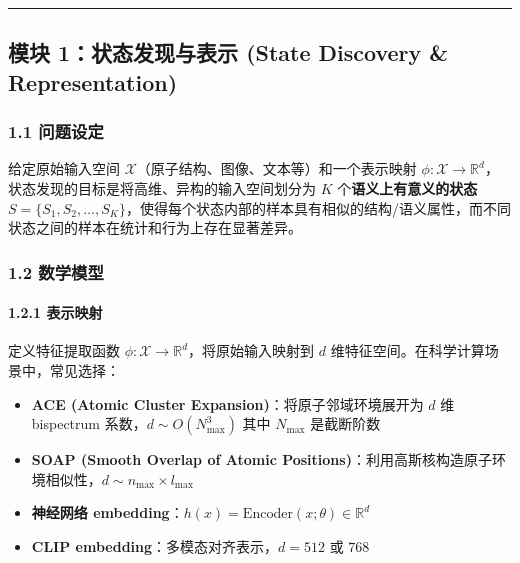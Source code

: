\documentclass[
  12pt,
]{ctexart}
\providecommand{\tightlist}{%
  \setlength{\itemsep}{0pt}\setlength{\parskip}{0pt}}
\begin{document}
\begin{center}\rule{0.5\linewidth}{0.5pt}\end{center}

\subsection{模块 1：状态发现与表示 (State Discovery \&
Representation)}\label{ux6a21ux5757-1ux72b6ux6001ux53d1ux73b0ux4e0eux8868ux793a-state-discovery-representation}

\subsubsection{1.1 问题设定}\label{ux95eeux9898ux8bbeux5b9a}

给定原始输入空间 \(\mathcal{X}\)（原子结构、图像、文本等）和一个表示映射
\(\phi: \mathcal{X} \to \mathbb{R}^d\)，状态发现的目标是将高维、异构的输入空间划分为
\(K\) 个\textbf{语义上有意义的状态}
\(S = \{S_1, S_2, \dots, S_K\}\)，使得每个状态内部的样本具有相似的结构/语义属性，而不同状态之间的样本在统计和行为上存在显著差异。

\subsubsection{1.2 数学模型}\label{ux6570ux5b66ux6a21ux578b}

\paragraph{1.2.1 表示映射}\label{ux8868ux793aux6620ux5c04}

定义特征提取函数
\(\phi: \mathcal{X} \to \mathbb{R}^d\)，将原始输入映射到 \(d\)
维特征空间。在科学计算场景中，常见选择：

\begin{itemize}
\tightlist
\item
  \textbf{ACE (Atomic Cluster Expansion)}：将原子邻域环境展开为 \(d\) 维
  bispectrum 系数，\(d \sim O(N_{\text{max}}^3)\) 其中
  \(N_{\text{max}}\) 是截断阶数
\item
  \textbf{SOAP (Smooth Overlap of Atomic
  Positions)}：利用高斯核构造原子环境相似性，\(d \sim n_{\text{max}} \times l_{\text{max}}\)
\item
  \textbf{神经网络
  embedding}：\(h(x) = \text{Encoder}(x; \theta) \in \mathbb{R}^d\)
\item
  \textbf{CLIP embedding}：多模态对齐表示，\(d = 512\) 或 \(768\)
\end{itemize}
\end{document}
